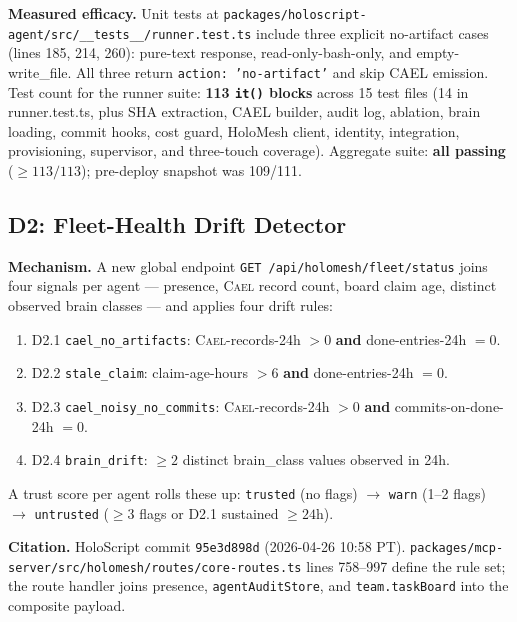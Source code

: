\documentclass[letterpaper,twocolumn,10pt]{article}
\newcommand{\cael}{\textsc{Cael}}
\newcommand{\holoscript}{HoloScript}
\begin{document}
\textbf{Measured efficacy.} Unit tests at
\texttt{packages/holoscript-agent/src/\_\_tests\_\_/runner.test.ts}
include three explicit no-artifact cases (lines 185, 214, 260):
pure-text response, read-only-bash-only, and empty-write\_file. All
three return \texttt{action: 'no-artifact'} and skip CAEL emission.
Test count for the runner suite: \textbf{113 \texttt{it()} blocks}
across 15 test files (14 in runner.test.ts, plus SHA extraction,
CAEL builder, audit log, ablation, brain loading, commit hooks, cost
guard, HoloMesh client, identity, integration, provisioning,
supervisor, and three-touch coverage). Aggregate suite:
\textbf{all passing} ($\geq 113/113$); pre-deploy snapshot was 109/111.

\subsection{D2: Fleet-Health Drift Detector}
\label{sec:d2}

\textbf{Mechanism.} A new global endpoint \texttt{GET
/api/holomesh/fleet/status} joins four signals per agent --- presence,
\cael{} record count, board claim age, distinct observed brain classes
--- and applies four drift rules:

\begin{enumerate}[topsep=2pt,itemsep=1pt]
\item D2.1 \texttt{cael\_no\_artifacts}: \cael{}-records-24h $> 0$
\textbf{and} done-entries-24h $= 0$.
\item D2.2 \texttt{stale\_claim}: claim-age-hours $> 6$ \textbf{and}
done-entries-24h $= 0$.
\item D2.3 \texttt{cael\_noisy\_no\_commits}: \cael{}-records-24h
$> 0$ \textbf{and} commits-on-done-24h $= 0$.
\item D2.4 \texttt{brain\_drift}: $\geq 2$ distinct brain\_class
values observed in 24h.
\end{enumerate}

A trust score per agent rolls these up: \texttt{trusted} (no flags)
$\rightarrow$ \texttt{warn} (1--2 flags) $\rightarrow$
\texttt{untrusted} ($\geq 3$ flags or D2.1 sustained $\geq 24\text{h}$).

\textbf{Citation.} \holoscript{} commit \texttt{95e3d898d}
(2026-04-26 10:58 PT).
\texttt{packages/mcp-server/src/holomesh/routes/core-routes.ts}
lines 758--997 define the rule set; the route handler joins
presence, \texttt{agentAuditStore}, and \texttt{team.taskBoard} into
the composite payload.
\end{document}
